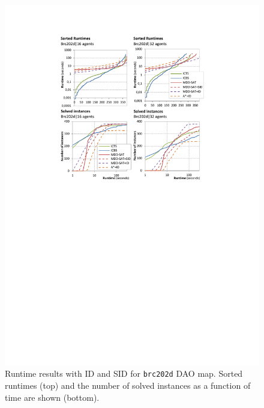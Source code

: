 \documentclass[jair,oneside,11pt]{article}
\begin{document}
\begin{figure}[h]
\centering
\includegraphics[trim={2.5cm 15.0cm 2.5cm 2.5cm},clip,width=1.0\textwidth]{expr-id_brc202_sorted.pdf}
\vspace{-0.6cm}\caption{Runtime results with ID and SID for \texttt{brc202d} DAO map. Sorted runtimes (top) and the number of solved instances as a function of time are shown (bottom).}
\label{figure-brc202-sorted-id}
\end{figure}
\end{document}

